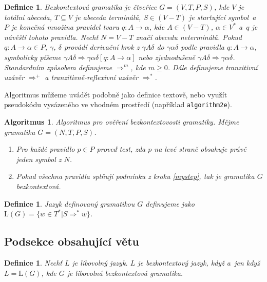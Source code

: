 \documentclass[11pt,a4paper,twocolumn]{article}
\newtheorem{mydef}[thm]{Definice}
\newtheorem{myalg}[thm]{Algoritmus}
\begin{document}
\begin{mydef}\label{mydef}
Bezkontextová gramatika \normalfont je čtveřice $G = (V,T,P,S)$, kde $V$ je totální abeceda, $T \subseteq V$ je a\-be\-ce\-da ter\-mi\-ná\-lů, $S \in (V - T)$ je startující symbol~a $P$ je konečná množina \emph{pravidel} tvaru $q: A \rightarrow \alpha$, kde $A \in (V - T)$, $\alpha \in V^*$ a~$q$ je návěští tohoto pravidla. Nechť $N = V - T$ značí abecedu neterminálů.
Pokud $q: A \rightarrow \alpha \in P$, $\gamma$, $\delta$ provádí derivační krok z $\gamma A \delta$ do $\gamma \alpha \delta$ podle pravidla $q: A \rightarrow \alpha$, symbolicky píšeme 
$\gamma A \delta \Rightarrow \gamma \alpha \delta [q: A \rightarrow \alpha]$ nebo zjednodušeně $\gamma A \delta \Rightarrow \gamma \alpha \delta$. Standardním způsobem definujeme $\Rightarrow^m$, kde $m \geq 0$. Dále definujeme tranzitivní uzávěr $\Rightarrow^+$ a tranzitivně-reflexivní uzávěr $\Rightarrow^*$.
\end{mydef}

Algoritmus můžeme uvádět podobně jako definice textově, nebo využít pseudokódu vysázeného ve vhodném prostředí (například \texttt{algorithm2e}).

\begin{myalg}
	Algoritmus pro ověření bezkontextovosti gramatiky. Mějme gramatiku $G = (N, T, P, S)$.
	\begin{enumerate}
		\item
			Pro každé pravidlo $p \in P$ proveď test, zda $p$ na levé straně obsahuje právě jeden symbol z $N$. \label{mystep}
		\item
			Pokud všechna pravidla splňují podmínku z kroku \ref{mystep}, tak je gramatika $G$ bezkontextová.
	\end{enumerate}   
\end{myalg}

\begin{mydef}
	Jazyk \normalfont definovaný gramatikou $G$ definujeme jako $\mathrm{L}(G) = \{w \in T^* | S \Rightarrow^* w \}$.
\end{mydef}

\subsection{Podsekce obsahující větu}

\begin{mydef}
	\normalfont
		Nechť $L$ je libovolný jazyk. $L$ je \emph{bezkontextový jazyk}, když a~jen když $L = \mathrm{L}(G)$, kde $G$ je libovolná bezkontextová gramatika.
\end{mydef}
\end{document}

